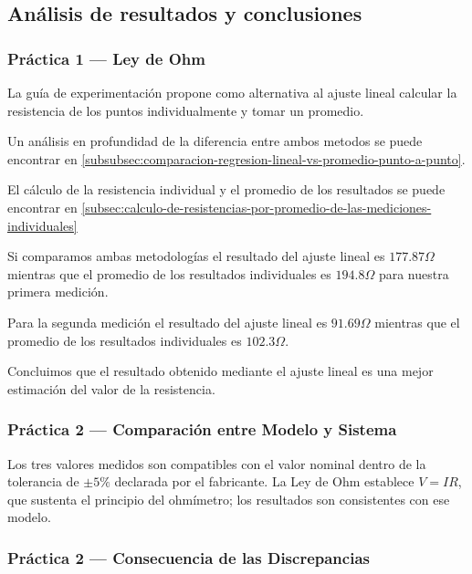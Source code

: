 \subsection{Análisis de resultados y conclusiones}
\label{subsec:analisis-de-resultados-y-conclusiones}

\subsubsection{Práctica 1 --- Ley de Ohm}

La guía de experimentación propone como alternativa al ajuste lineal calcular la resistencia de los puntos individualmente y tomar un promedio.

Un análisis en profundidad de la diferencia entre ambos metodos se puede encontrar en \ref{subsubsec:comparacion-regresion-lineal-vs-promedio-punto-a-punto}.

El cálculo de la resistencia individual y el promedio de los resultados se puede encontrar en \ref{subsec:calculo-de-resistencias-por-promedio-de-las-mediciones-individuales}

Si comparamos ambas metodologías el resultado del ajuste lineal es $177.87\varOmega$ mientras que el promedio de los resultados individuales es $194.8\varOmega$ para nuestra primera medición.

Para la segunda medición el resultado del ajuste lineal es $91.69\varOmega$ mientras que el promedio de los resultados individuales es $102.3\varOmega$.

Concluimos que el resultado obtenido mediante el ajuste lineal es una mejor estimación del valor de la resistencia.


\subsubsection{Práctica 2 --- Comparación entre Modelo y Sistema}

Los tres valores medidos son compatibles con el valor nominal dentro de la tolerancia de $\pm 5\%$ declarada por el fabricante.
La Ley de Ohm establece $V = IR$, que sustenta el principio del ohmímetro; los resultados son consistentes con ese modelo.

\subsubsection{Práctica 2 --- Consecuencia de las Discrepancias}

